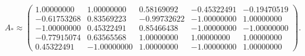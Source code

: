 \[
 A_*\approx\begin{pmatrix}
1.00000000 & 1.00000000 & 0.58169092 & -0.45322491 & -0.19470519\\
-0.61753268 & 0.83569223 & -0.99732622 & -1.00000000 & 1.00000000\\
-1.00000000 & 0.45322491 & 0.85466438 & -1.00000000 & -1.00000000\\
-0.77915074 & 0.63565568 & 1.00000000 & 1.00000000 & 1.00000000\\
0.45322491 & -1.00000000 & 1.00000000 & -1.00000000 & 1.00000000
\end{pmatrix}.
\]
